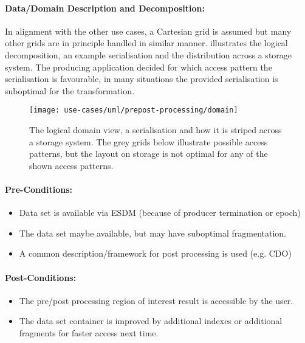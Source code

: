 \paragraph{Data/Domain Description and Decomposition:}
In alignment with the other use cases, a Cartesian grid is assumed but many other grids are in principle handled in similar manner.
 illustrates the logical decomposition, an example serialisation and the distribution across a storage system.
The producing application decided for which access pattern the serialisation is favourable, in many situations the provided serialisation is suboptimal for the transformation.


\begin{figure}
	\centering
	\texttt{[image: use-cases/uml/prepost-processing/domain]}
	\caption{The logical domain view, a serialisation and how it is striped across a storage system. The grey grids below illustrate possible access patterns, but the layout on storage is not optimal for any of the shown access patterns. }
	\label{fig:domain pre + post processing}
\end{figure}


\paragraph{Pre-Conditions:}
\begin{itemize}
	\item Data set is available via ESDM (because of producer termination or epoch)
	\item The data set maybe available, but may have suboptimal fragmentation.
	\item A common description/framework for post processing is used (e.g. CDO)
\end{itemize}

\paragraph{Post-Conditions:}
\begin{itemize}
	\item The pre/post processing region of interest result is accessible by the user.
	\item The data set container is improved by additional indexes or additional fragments for faster access next time.
\end{itemize}

